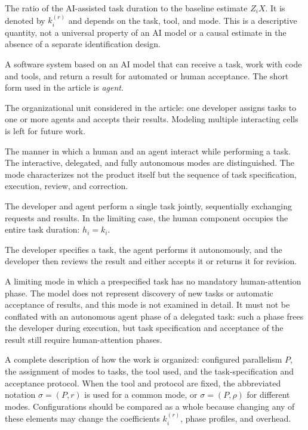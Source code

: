 \begin{description}[style=nextline]
  \item[Normalized AI-Assisted Duration] The ratio of the AI-assisted task
  duration to the baseline estimate $Z_iX$. It is denoted by $k_i^{(r)}$ and
  depends on the task, tool, and mode. This is a descriptive quantity, not a
  universal property of an AI model or a causal estimate in the absence of a
  separate identification design.

  \item[AI Coding Agent] A software system based on an AI model that can receive
  a task, work with code and tools, and return a result for automated or human
  acceptance. The short form used in the article is \emph{agent}.

  \item[Human--Agent Cell] The organizational unit considered in the article:
  one developer assigns tasks to one or more agents and accepts their results.
  Modeling multiple interacting cells is left for future work.

  \item[Operating Mode] The manner in which a human and an agent interact while
  performing a task. The interactive, delegated, and fully autonomous modes are
  distinguished. The mode characterizes not the product itself but the sequence
  of task specification, execution, review, and correction.

  \item[Interactive Mode] The developer and agent perform a single task jointly,
  sequentially exchanging requests and results. In the limiting case, the human
  component occupies the entire task duration: $h_i=k_i$.

  \item[Delegated Mode] The developer specifies a task, the agent performs it
  autonomously, and the developer then reviews the result and either accepts it
  or returns it for revision.

  \item[Fully Autonomous Mode] A limiting mode in which a prespecified task has
  no mandatory human-attention phase. The model does not represent discovery
  of new tasks or automatic acceptance of results, and this mode is not
  examined in detail. It must not be conflated with an autonomous agent phase
  of a delegated task: such a phase frees the developer during execution, but
  task specification and acceptance of the result still require
  human-attention phases.

  \item[Process Configuration] A complete description of how the work is
  organized: configured parallelism $P$, the assignment of modes to tasks, the
  tool used, and the task-specification and acceptance protocol. When the tool
  and protocol are fixed, the abbreviated notation $\sigma=(P,r)$ is used for a
  common mode, or $\sigma=(P,\rho)$ for different modes. Configurations should
  be compared as a whole because changing any of these elements may change the
  coefficients $k_i^{(r)}$, phase profiles, and overhead.


\end{description}
